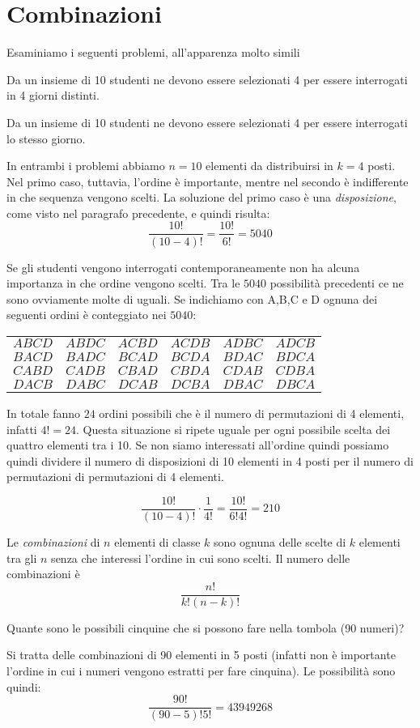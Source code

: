 \section{Combinazioni}
\label{sec:04_combinazioni}
Esaminiamo i seguenti problemi, all'apparenza molto simili
\begin{itemize*}
\item Da un insieme di 10 studenti ne devono essere selezionati 4 per essere interrogati in 4 giorni distinti.
\item Da un insieme di 10 studenti ne devono essere selezionati 4 per essere interrogati lo stesso giorno.
\end{itemize*}
In entrambi i problemi abbiamo $n=10$ elementi da distribuirsi in $k=4$ posti. Nel primo caso, tuttavia, l'ordine è importante, mentre nel secondo 
è indifferente in che sequenza vengono scelti.
La soluzione del primo caso è una \emph{disposizione}, come visto nel paragrafo precedente, e quindi risulta:
$$\dfrac{10!}{(10-4)!}=\dfrac{10!}{6!}=5040$$

Se gli studenti vengono interrogati contemporaneamente non ha alcuna importanza in che ordine vengono scelti. 
Tra le $5040$ possibilità precedenti ce ne sono ovviamente molte di uguali. Se indichiamo con A,B,C e D ognuna dei seguenti ordini è conteggiato nei $5040$:
\begin{center}
\begin{tabular}{cccccc}
	$A B C D$ & $A B D C$ & $A C B D$ & $A C D B$ & $A D B C $ & $A D C B$\\
	$B A C D$ & $B A D C$ & $B C A D$ & $B C D A$ & $B D A C $ & $B D C A$\\
	$C A B D$ & $C A D B$ & $C B A D$ & $C B D A$ & $C D A B $ & $C D B A$\\
	$D A C B$ & $D A B C$ & $D C A B$ & $D C B A$ & $D B A C $ & $D B C A$\\
\end{tabular}
\end{center}
In totale fanno $24$ ordini possibili che è il numero di permutazioni di 4 elementi, infatti $4!=24$. Questa situazione si ripete uguale per ogni possibile scelta dei quattro elementi tra i 10. Se non siamo interessati all'ordine quindi possiamo quindi dividere il numero di disposizioni di 10 elementi in 4 posti per il numero di permutazioni di permutazioni di 4 elementi.

$$\dfrac{10!}{(10-4)!}\cdot\dfrac{1}{4!}=\dfrac{10!}{6!4!}=210$$


\begin{definizione}
Le \emph{combinazioni} di $n$ elementi di classe $k$ sono ognuna delle scelte di $k$ elementi tra gli $n$ senza che interessi l'ordine in cui sono scelti. Il numero delle combinazioni è
$$ \dfrac{n!}{k!(n-k)!}$$
\end{definizione}
\begin{esempio}
Quante sono le possibili cinquine che si possono fare nella tombola (90 numeri)?

Si tratta delle combinazioni di 90 elementi in 5 posti (infatti non è importante l'ordine in cui i numeri vengono estratti per fare cinquina). Le possibilità sono quindi:
$$ \dfrac{90!}{(90-5)!5!}=43 949 268$$
\end{esempio}

